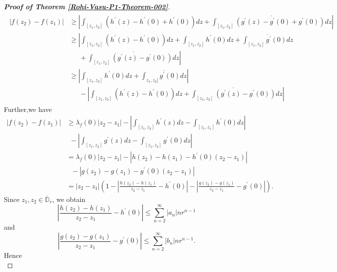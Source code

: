 \documentclass[a4paper,12pt]{amsart}
\theoremstyle{plain}
\theoremstyle{definition}
\begin{document}
\begin{proof}[{\bf Proof of Theorem   \ref{Rohi-Vasu-P1-Theorem-002}}]
\begin{align*}
\begin{split}
\left|f\left(z_2\right)-f\left(z_1\right)\right| & \geq \left| \int_{\left[z_1, z_2\right]}\left(h^{\prime}(z)-h^{\prime}(0)+h^{\prime}(0)\right) d z+\overline{\int_{\left[z_1, z_2\right]}\left(g^{\prime}(z)-g^{\prime}(0)+g^{\prime}(0)\right) d z} \right| \\
&\geq  \left| \int_{[z_1, z_2]}\left(h^{\prime}(z)-h^{\prime}(0)\right) d z+\int_{\left[z_1, z_2\right]} h^{\prime}(0) d z+ \overline{\int_{[z_1, z_2]} g^{\prime}(0) d z} \right. \\ & \ \ \quad+ \left. \overline{\int_{\left[z_1, z_2\right]}\left(g^{\prime}(z)-g^{\prime}(0)\right) d z} \right| \\ 
&\geq \left|\int_{\left[z_1, z_2\right]} h^{\prime}(0) d z+\overline{\int_{z_1, z_2]} g^{\prime}(0) d z}\right| \\ & \ 
 \ \quad-\left|\int_{\left[z_1, z_2\right]}\left(h^{\prime}(z)-h^{\prime}(0)\right) d z  +\overline{\int_{[z_1,z_2]}\left(g^{\prime}(z)-g^{\prime}(0)\right)} d z \right|
\end{split}
\end{align*}
Further,we have
\begin{align*}
\left|f\left(z_2\right)-f\left(z_1\right)\right| & \geq \lambda_f(0)\left|z_2-z_1\right|-\left|\int_{\left[z_1, z_2\right]} 
h^{\prime}\left(z\right) d z-\int_{\left[z_1, z_1\right]} h^{\prime}(0) d z\right| \\& \ \ -\left|\int_{\left[z_1, z_2\right]} g^{\prime}(z) d z-\int_{\left[z_1, z_2\right]} g^{\prime}(0) d z\right| \\
&= \lambda_f(0)\left|z_2-z_1\right|-\left|h\left(z_2\right)-h\left(z_1\right)-h^{\prime}(0)\left(z_2-z_1\right)\right| \\&
\ \ \  -\left|g\left(z_2\right)-g\left(z_1\right)-g^{\prime}(0)\left(z_2-z_1\right)\right| \\
& =|z_2-z_1| \left(1-\left|\frac{h\left(z_2\right)-h\left(z_1\right)}{z_2-z_1}-h^{\prime}(0)\right| 
-\left|\frac{g\left(z_2\right)-g\left(z_1\right)}{z_2-z_1}-g^{\prime}
(0)\right|\right).
\end{align*}
Since $z_1, z_2 \in \mathbb{\overline{D}}_r$, we obtain 
$$
\left|\frac{h\left(z_2\right)-h\left(z_1\right)}{z_2-z_1}-h^{\prime}(0)\right| \leq \sum_{n=2}^{\infty}\left|a_n\right| n r^{n-1} 
$$
and
$$
\left|\frac{g\left(z_2\right)-g\left(z_1\right)}{z_2-z_1}-g^{\prime}(0)\right| \leq \sum_{n=2}^{\infty}\left|b_n\right| n r^{n-1}.
$$
Hence 
\begin{equation}\label{Rohi-Vasu-P1-Eq-002a}

\end{equation}
\end{proof}
\end{document}
